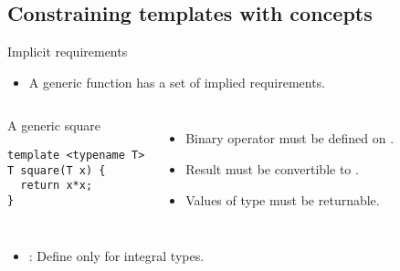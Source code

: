 \subsection{Constraining templates with concepts}

\begin{frame}[t,fragile]{Implicit requirements}
\begin{itemize}
  \item A generic function has a set of implied requirements.
\end{itemize}

\begin{columns}[T]

\begin{block}{A generic square}
\begin{lstlisting}
template <typename T>
T square(T x) {
  return x*x;
}
\end{lstlisting}
\end{block}

\begin{itemize}
  \item Binary operator \cppkey{*} must be defined on .
  \item Result must be convertible to .
  \item Values of type  must be returnable.
\end{itemize}

\end{columns}

\begin{itemize}
  \item {}: Define only for integral types.
\end{itemize}

\end{frame}

